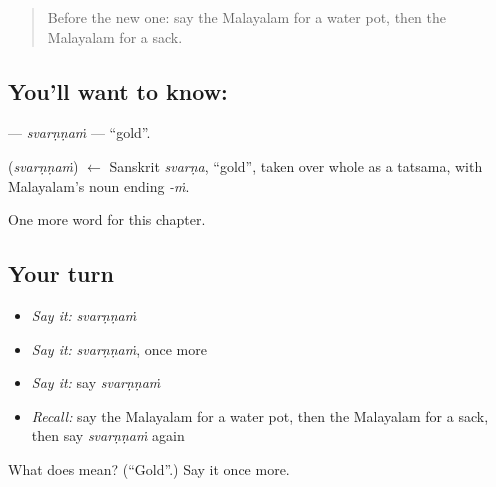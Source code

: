 \begin{quote}
Before the new one: say the Malayalam for a water pot, then the Malayalam for a sack.
\end{quote}

\subsection*{You'll want to know: }
\textbf{} — \emph{svarṇṇaṁ} — \textquotedblleft{}gold\textquotedblright{}.

\begin{cousinweb}
\textbf{} (\emph{svarṇṇaṁ}) $\leftarrow$ Sanskrit \emph{svarṇa}, \textquotedblleft{}gold\textquotedblright{}, taken over whole as a tatsama, with Malayalam's noun ending \emph{-ṁ}.
\end{cousinweb}

\begin{grammarlens}[title={What you've built}]
One more word for this chapter.
\end{grammarlens}

\subsection*{Your turn}
\begin{itemize}
\raggedright
  \item \emph{Say it:} \emph{svarṇṇaṁ}
  \item \emph{Say it:} \emph{svarṇṇaṁ}, once more
  \item \emph{Say it:} say \emph{svarṇṇaṁ}
  \item \emph{Recall:} say the Malayalam for a water pot, then the Malayalam for a sack, then say \emph{svarṇṇaṁ} again
\end{itemize}

\begin{tcolorbox}[breakable,colback=teal!4,colframe=teal!35!black,title={Before you move on}]
What does  mean? (\textquotedblleft{}Gold\textquotedblright{}.) Say it once more.
\end{tcolorbox}
